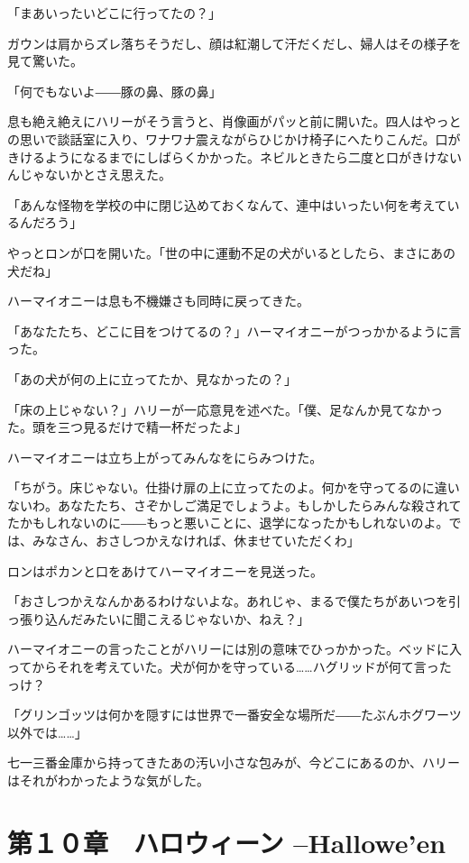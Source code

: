 \documentclass[10pt,a4paper]{article}
\begin{document}
\begin{CJK}{UTF8}{min}
「まあいったいどこに行ってたの？」

ガウンは肩からズレ落ちそうだし、顔は紅潮して汗だくだし、婦人はその様子を見て驚いた。

「何でもないよ――豚の鼻、豚の鼻」

息も絶え絶えにハリーがそう言うと、肖像画がパッと前に開いた。四人はやっとの思いで談話室に入り、ワナワナ震えながらひじかけ椅子にへたりこんだ。口がきけるようになるまでにしばらくかかった。ネビルときたら二度と口がきけないんじゃないかとさえ思えた。

「あんな怪物を学校の中に閉じ込めておくなんて、連中はいったい何を考えているんだろう」

やっとロンが口を開いた。「世の中に運動不足の犬がいるとしたら、まさにあの犬だね」

ハーマイオニーは息も不機嫌さも同時に戻ってきた。

「あなたたち、どこに目をつけてるの？」ハーマイオニーがつっかかるように言った。

「あの犬が何の上に立ってたか、見なかったの？」

「床の上じゃない？」ハリーが一応意見を述べた。「僕、足なんか見てなかった。頭を三つ見るだけで精一杯だったよ」

ハーマイオニーは立ち上がってみんなをにらみつけた。

「ちがう。床じゃない。仕掛け扉の上に立ってたのよ。何かを守ってるのに違いないわ。あなたたち、さぞかしご満足でしょうよ。もしかしたらみんな殺されてたかもしれないのに――もっと悪いことに、退学になったかもしれないのよ。では、みなさん、おさしつかえなければ、休ませていただくわ」

ロンはポカンと口をあけてハーマイオニーを見送った。

「おさしつかえなんかあるわけないよな。あれじゃ、まるで僕たちがあいつを引っ張り込んだみたいに聞こえるじゃないか、ねえ？」

ハーマイオニーの言ったことがハリーには別の意味でひっかかった。ベッドに入ってからそれを考えていた。犬が何かを守っている……ハグリッドが何て言ったっけ？

「グリンゴッツは何かを隠すには世界で一番安全な場所だ――たぶんホグワーツ以外では……」

七一三番金庫から持ってきたあの汚い小さな包みが、今どこにあるのか、ハリーはそれがわかったような気がした。



\section{第１０章　ハロウィーン --Hallowe'en}






\end{CJK}
\end{document}
